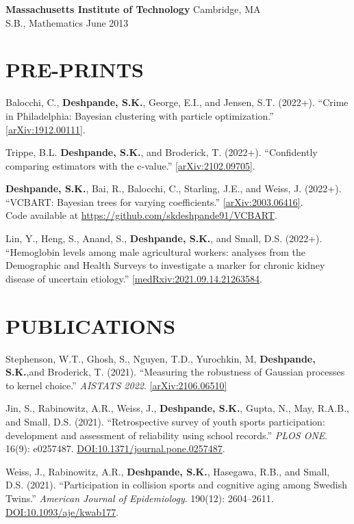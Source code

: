 \documentclass[margin]{res}
\begin{document}
\begin{resume}
                {\bf Massachusetts Institute of Technology} \hfill Cambridge, MA \\
                S.B., Mathematics \hfill June 2013 
  
  
\section{PRE-PRINTS}

Balocchi, C., \textbf{Deshpande, S.K.}, George, E.I., and Jensen, S.T. (2022+). ``Crime in Philadelphia: Bayesian clustering with particle optimization.'' \href{https://arxiv.org/abs/1912.00111}{[arXiv:1912.00111]}.

Trippe, B.L. \textbf{Deshpande, S.K.}, and Broderick, T. (2022+). ``Confidently comparing estimators with the c-value.'' \href{https://arxiv.org/abs/2102.09705}{[arXiv:2102.09705]}. 

\textbf{Deshpande, S.K.}, Bai, R., Balocchi, C., Starling, J.E., and Weiss, J. (2022+). ``VCBART: Bayesian trees for varying coefficients.'' \href{https://arxiv.org/abs/2003.06416}{[arXiv:2003.06416]}. \\ Code available at \url{https://github.com/skdeshpande91/VCBART}.

Lin, Y., Heng, S., Anand, S., \textbf{Deshpande, S.K.}, and Small, D.S. (2022+). ``Hemoglobin levels among male agricultural workers: analyses from the Demographic and Health Surveys to investigate a marker for chronic kidney disease of uncertain etiology.'' \href{https://www.medrxiv.org/content/10.1101/2021.09.14.21263584v2}{[medRxiv:2021.09.14.21263584}.

\section{PUBLICATIONS}

Stephenson, W.T., Ghosh, S., Nguyen, T.D., Yurochkin, M, \textbf{Deshpande, S.K.},and Broderick, T. (2021). ``Measuring the robustness of Gaussian processes to kernel choice.'' \textit{AISTATS 2022}. \href{https://arxiv.org/abs/2106.06510}{[arXiv:2106.06510]}

Jin, S., Rabinowitz, A.R., Weiss, J., \textbf{Deshpande, S.K.}, Gupta, N., May, R.A.B., and Small, D.S. (2021). ``Retrospective survey of youth sports participation: development and assessment of reliability using school records.'' \textit{PLOS ONE}. 16(9): e0257487. \href{https://doi.org/10.1371/journal.pone.0257487}{DOI:10.1371/journal.pone.0257487}.

Weiss, J., Rabinowitz, A.R., \textbf{Deshpande, S.K.}, Hasegawa, R.B., and Small, D.S. (2021). ``Participation in collision sports and cognitive aging among Swedish Twins.'' \textit{American Journal of Epidemiology}. 190(12): 2604--2611. \href{https://doi.org/10.1093/aje/kwab177}{DOI:10.1093/aje/kwab177}.


\end{resume}
\end{document}
